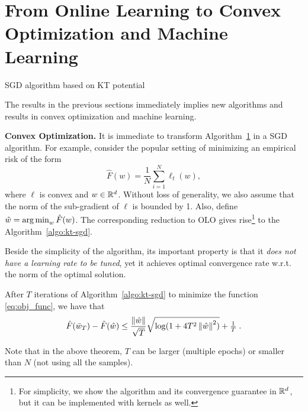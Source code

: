 \section{From Online Learning to Convex Optimization and Machine Learning}

\begin{algorithm}[t]
\caption{SGD algorithm based on KT potential
\label{algo:kt-sgd}}
\begin{algorithmic}
{
\ENDFOR
{}
}
\end{algorithmic}
\end{algorithm}

The results in the previous sections immediately implies new algorithms and results in convex optimization and machine learning.

\textbf{Convex Optimization.} It is immediate to transform Algorithm~\ref{} in a \ac{SGD} algorithm.
For example, consider the popular setting of minimizing an empirical risk of the form
\begin{equation}
\label{eq:obj_func}
\hat{F}(w) = \frac{1}{N} \sum_{i=1}^N \ell_t(w),
\end{equation}
where $\ell$ is convex and $w \in \mathbb{R}^d$. Without loss of generality, we also assume that the norm of the sub-gradient of $\ell$ is bounded by 1. Also, define $\hat{w}=  \operatorname*{arg\,min}_w \hat{F}(w)$.
The corresponding reduction to OLO gives rise\footnote{For simplicity, we show the algorithm and its convergence guarantee in $\mathbb{R}^d$, but it can be implemented with kernels as well.} to the Algorithm~\ref{algo:kt-sgd}.

Beside the simplicity of the algorithm, its important property is that it \emph{does not have a learning rate to be tuned}, yet it achieves optimal convergence rate w.r.t. the norm of the optimal solution.

\begin{theorem}
After $T$ iterations of Algorithm~\ref{algo:kt-sgd} to minimize the function \eqref{eq:obj_func}, we have that
\[
\hat{F}(\bar{w}_T) - \hat{F}(\hat{w}) \leq \frac{\left\|{\hat{w}}\right\|}{\sqrt{T}} \sqrt{\log(1+4 T^2 \left\|{\hat{w}}\right\|^2)} +\tfrac{1}{T} \; .
\]
\end{theorem}
Note that in the above theorem, $T$ can be larger (multiple epochs) or smaller than $N$ (not using all the samples).

